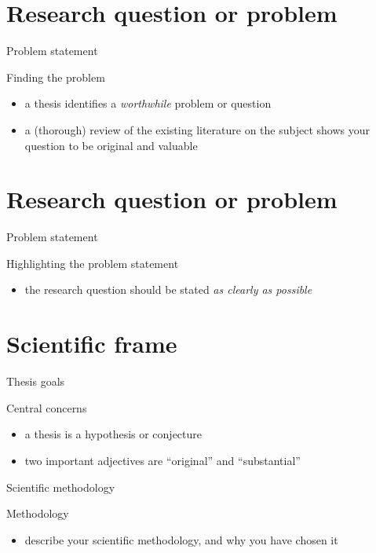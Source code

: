 \documentclass{beamer}
\begin{document}
\section{Research question or problem}
\begin{frame}{Problem statement}
\begin{block}{Finding the problem}
\begin{itemize}
\item a thesis identifies a \textit{worthwhile} problem or question
\item a (thorough) review of the existing literature on the subject shows your question to be original and valuable
\end{itemize}
\end{block}
\end{frame}


\section{Research question or problem}
\begin{frame}{Problem statement}
\begin{block}{Highlighting the problem statement}
\begin{itemize}
\item the research question should be stated \textit{as clearly as possible}
\end{itemize}
\end{block}
\end{frame}


\section{Scientific frame}
\begin{frame}{Thesis goals}
\begin{block}{Central concerns}
\begin{itemize}
\item a thesis is a hypothesis or conjecture
\item two important adjectives are ``original'' and ``substantial''
\end{itemize}
\end{block}
\end{frame}


\begin{frame}{Scientific methodology}
\begin{block}{Methodology}
\begin{itemize}
\item describe your scientific methodology, and why you have chosen it
\end{itemize}
\end{block}
\end{frame}
\end{document}
